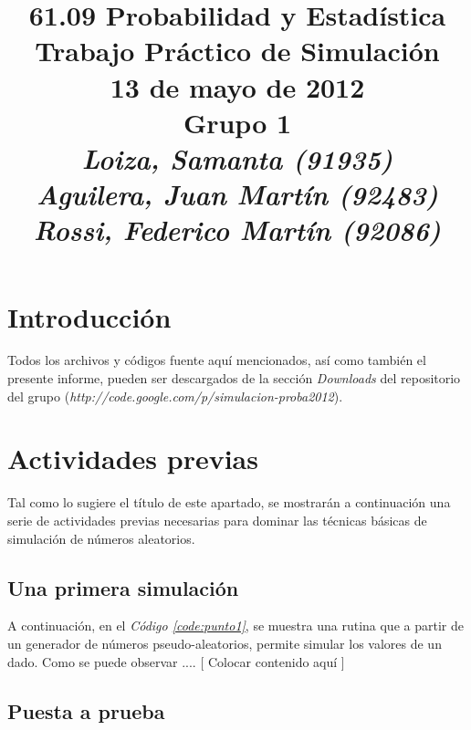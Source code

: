 \documentclass{article}
\newcommand{\refcode}[1]{\textit{Código \ref{#1}}}
\begin{document}
\title{\huge 61.09 Probabilidad y Estadística \\ 
	  \Huge Trabajo Práctico de Simulación \\
	  \bigskip \Large 13 de mayo de 2012 \\
	  \bigskip \large \textbf{Grupo 1} \\
	  \large \textit{Loiza, Samanta (91935)\\Aguilera, Juan Martín (92483)\\Rossi, Federico Martín (92086)}}
\date{}
\maketitle



\section{Introducción}

	Todos los archivos y códigos fuente aquí mencionados, así como también el presente informe, pueden ser descargados de la sección \textit{Downloads} del repositorio del grupo (\textit{http://code.google.com/p/simulacion-proba2012}).



\section{Actividades previas}

Tal como lo sugiere el título de este apartado, se mostrarán a continuación una serie de actividades previas necesarias para dominar las técnicas básicas de simulación de números aleatorios.


\subsection{Una primera simulación}

A continuación, en el \refcode{code:punto1}, se muestra una rutina que a partir de un generador de números pseudo-aleatorios, permite simular los valores de un dado. Como se puede observar .... [ Colocar contenido aquí ]



\subsection{Puesta a prueba}
\end{document}
